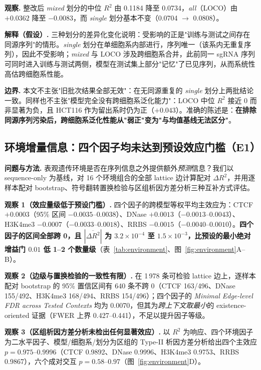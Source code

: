 \textbf{观察.} 整改后 \emph{mixed} 划分的中位 $R^{2}$ 由 0.1184 降至 0.0734，\emph{all}（LOCO）由 $+0.0362$ 降至 $-0.0083$，而 \emph{single} 划分基本不变（0.0704 $\rightarrow$ 0.0808）。

\textbf{解释（假设）.} 三种划分的差异化变化说明：受影响的正是"训练与测试之间存在同源序列"的情形。\emph{single} 划分在单细胞系内部进行，序列唯一（该系内无重复序列），因此不受影响；\emph{mixed} 与 LOCO 涉及跨细胞系合并，此前同一 sgRNA 序列可同时进入训练与测试两侧，模型在测试集上部分"记忆"了已见序列，从而系统性高估跨细胞系性能。

\textbf{边界.} 本文不主张"旧批次结果全部无效"：在无同源重复的 \emph{single} 划分上两批结论一致。同样也不主张"模型完全没有跨细胞系泛化能力"：LOCO 中位 $R^{2}$ 接近 0 而非显著为负，且 HCT116 作为留出系时仍为正（$+0.043$）。准确的陈述是：\textbf{在排除同源序列污染后，跨细胞系泛化性能从"弱正"变为"与均值基线无法区分"}。

\subsection{环境增量信息：四个因子均未达到预设效应门槛（E1）}
\label{sec:res-environment}

\textbf{问题与方法.} 表观遗传环境是否在序列信息之外提供额外\emph{预测}信息？我们以 sequence-only 为基线，对 16 个环境组合的全部 lattice 边计算配对 $\Delta R^{2}$，并用逐样本配对 bootstrap、符号翻转置换检验与区组析因方差分析三种互补方式评估。

\textbf{观察 1（效应量级低于预设门槛）.} 四个因子的跨模型等权平均主效应为：CTCF $+0.0003$（95\% 区间 $-0.0035$--$0.0038$）、DNase $+0.0013$（$-0.0013$--$0.0043$）、H3K4me3 $-0.0007$（$-0.0033$--$0.0018$）、RRBS $-0.0015$（$-0.0040$--$0.0010$）。\textbf{四个因子的区间全部跨 0，且 $|\overline{\Delta R^{2}}|$ 为 $3.2\times10^{-4}$ 至 $1.5\times10^{-3}$，比预设的最小绝对增益门 $0.01$ 低 1--2 个数量级}（表~\ref{tab:environment}、图~\ref{fig:environment}A--B）。

\textbf{观察 2（边级与置换检验的一致性有限）.} 在 1\,978 条可检验 lattice 边上，逐样本配对 bootstrap 的 95\% 置信区间有 640 条不跨 0（CTCF 163/496、DNase 155/492、H3K4me3 168/494、RRBS 154/496）；四个因子的 \emph{Minimal Edge-level FDR across Tested Contexts} 均为 0.0070，但其为\emph{跨上下文取最小}的 existence-oriented 证据（FWER 上界 0.427--0.441），不足以提升因子等级。

\textbf{观察 3（区组析因方差分析未检出任何显著效应）.} 以 $R^{2}$ 为响应、四个环境因子为二水平因子、模型/细胞系/划分为区组的 Type-II 析因方差分析给出四个主效应 $p=0.975$--$0.9996$（CTCF 0.9892、DNase 0.9996、H3K4me3 0.9753、RRBS 0.9867），六个成对交互 $p=0.58$--$0.97$（图~\ref{fig:environment}D）。

